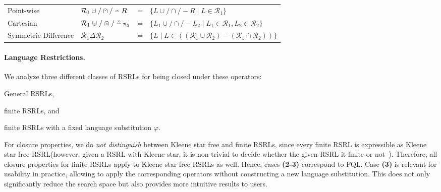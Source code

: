 \documentclass[envcountsame]{llncs}
\newcommand{\rationalset}{\ensuremath{\mathcal{R}}\xspace}
\newcommand{\dotdiv}{\:\ensuremath{\mathaccent\cdot-}\:}
\newcommand{\dotcup}{\:\ensuremath{\mathaccent\cdot\cup}\:}
\newcommand{\dotcap}{\:\ensuremath{\mathaccent\cdot\cap}\:}
\newcommand{\timescup}{\mathrel{\ooalign{\hss$\scriptscriptstyle\mathaccent\times{ }$\hss\cr$\cup$}}}
\newcommand{\timescap}{\mathrel{\ooalign{\hss$\scriptscriptstyle\mathaccent\times{ }$\hss\cr$\cap$}}}
\newcommand{\timesminus}{\:\ensuremath{\scriptscriptstyle\mathaccent\times{\textstyle-}}\:}
\newcommand{\RegularlyGeneratedLanguageSetAbbrev}{RSRL\xspace}
\newcommand{\RegularlyGeneratedLanguageSetsAbbrev}{RSRLs\xspace}
\newcommand{\RegularlyGeneratedLanguageSetsTitleAbbrev}{RSRL\xspace}
\newcommand{\FQL}{FQL\xspace}
\begin{document}
\begin{definition}[Operations on \RegularlyGeneratedLanguageSetsTitleAbbrev]
\begin{center}
{\begin{tabularx}{\textwidth}{p{10.5em}lp{2em}X}
     \hspace*{2em}Point-wise\hfill & $\rationalset_1 \dotcup / \dotcap / \dotdiv R$ & = & $\{ L
      \cup / \cap / - R \mid L \in \rationalset_1 \}$ 
      \\
      
      \hspace*{2em}Cartesian & $\rationalset_1 \timescup / \timescap / \timesminus \rationalset_2$ & = & 
      $\{ L_1 \cup / \cap / - L_2 \mid L_1\in \rationalset_1, L_2 \in \rationalset_2 \}$\\
      
      Symmetric Difference & $\rationalset_1 \Delta \rationalset_2$ & = & 
      $\{ L \mid L \in ((\rationalset_1 \cup \rationalset_2) -
      (\rationalset_1 \cap \rationalset_2)) \}$\\			
      \bottomrule
    \end{tabularx}
   }
  \end{center}
\end{definition}


\paragraph*{Language Restrictions.}
\label{sec:lang-restr}
We analyze three different classes of \RegularlyGeneratedLanguageSetsAbbrev for being closed
under these operators:
\begin{inparaenum}[\bfseries(1)]
\item General \RegularlyGeneratedLanguageSetsAbbrev,
\item finite \RegularlyGeneratedLanguageSetsAbbrev, and
\item finite \RegularlyGeneratedLanguageSetsAbbrev with a fixed
  language substitution $\varphi$.
\end{inparaenum}
For closure properties, we do \emph{not distinguish} between Kleene
star free and finite \RegularlyGeneratedLanguageSetsAbbrev, since
every finite \RegularlyGeneratedLanguageSetAbbrev is expressible as
Kleene star free \RegularlyGeneratedLanguageSetAbbrev (however, given
a \RegularlyGeneratedLanguageSetAbbrev with Kleene star, it is
non-trivial to decide whether the given
\RegularlyGeneratedLanguageSetAbbrev it finite or not~\cite{membership}).
Therefore, all closure properties for finite
\RegularlyGeneratedLanguageSetsAbbrev apply to Kleene star free
\RegularlyGeneratedLanguageSetsAbbrev as well.
Hence, cases {\bfseries(2-3)} correspond to \FQL.
Case {\bfseries(3)} is relevant for usability in practice, allowing to
apply the corresponding operators without constructing a new language
substitution. 
This does not only significantly reduce the search space but also
provides more intuitive results to users.
\end{document}
